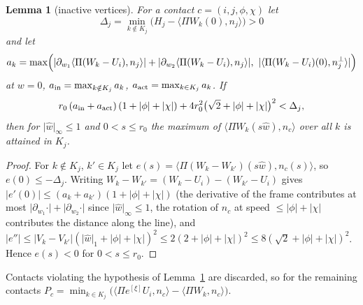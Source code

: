 \documentclass[11pt]{amsart}
\newtheorem{lemma}[theorem]{Lemma}
\theoremstyle{definition}
\newcommand{\Prj}{\Pi}
\newcommand{\ip}[2]{\langle #1,#2\rangle}
\newcommand{\abs}[1]{\lvert #1\rvert}
\begin{document}
\begin{lemma}[inactive vertices]\label{lem:inactive}
For a contact $c=(i,j,\phi,\chi)$ let
\[\Delta_j=\min_{k\notin K_j}\bigl(H_j-\ip{\Prj W_k(0)}{n_j}\bigr)>0\]
and let
\[
a_k=\max\Bigl(\abs{\partial_{w_1}\ip{\Prj(W_k-U_i)}{n_j}}+\abs{\partial_{w_2}\ip{\Prj(W_k-U_i)}{n_j}},\ \abs{\ip{\Prj(W_k-U_i)(0)}{n_j^{\perp}}}\Bigr)
\]
at $w=0$, $a_{\rm in}=\max_{k\notin K_j}a_k$, $a_{\rm act}=\max_{k\in K_j}a_k$. If
\[
r_0\,(a_{\rm in}+a_{\rm act})\,(1+\abs\phi+\abs\chi)+4r_0^2\bigl(\sqrt2+\abs\phi+\abs\chi\bigr)^2<\Delta_j ,
\]
then for $\abs{\hat w}_\infty\le1$ and $0<s\le r_0$ the maximum of $\ip{\Prj W_k(s\hat w)}{n_c}$ over all $k$ is attained in $K_j$.
\end{lemma}
\begin{proof}
For $k\notin K_j$, $k'\in K_j$ let $e(s)=\ip{\Prj(W_k-W_{k'})(s\hat w)}{n_c(s)}$, so $e(0)\le-\Delta_j$. Writing
$W_k-W_{k'}=(W_k-U_i)-(W_{k'}-U_i)$ gives $\abs{e'(0)}\le(a_k+a_{k'})(1+\abs\phi+\abs\chi)$ (the derivative of the
frame contributes at most $\abs{\partial_{w_1}\cdot}+\abs{\partial_{w_2}\cdot}$ since $\abs{\hat w}_\infty\le1$, the rotation of
$n_c$ at speed $\le\abs\phi+\abs\chi$ contributes the distance along the line), and
$\abs{e''}\le\abs{V_k-V_{k'}}(\abs{\hat w}_1+\abs\phi+\abs\chi)^2\le2(2+\abs\phi+\abs\chi)^2\le8(\sqrt2+\abs\phi+\abs\chi)^2$.
Hence $e(s)<0$ for $0<s\le r_0$.
\end{proof}
Contacts violating the hypothesis of Lemma~\ref{lem:inactive} are discarded, so for the remaining contacts
$P_c=\min_{k\in K_j}\bigl(\ip{\Prj e^{[\xi]}U_i}{n_c}-\ip{\Prj W_k}{n_c}\bigr)$.
\end{document}
